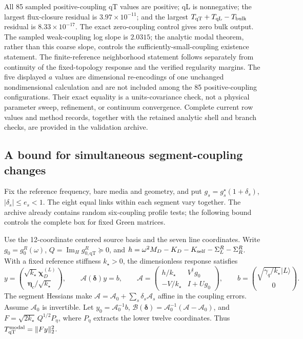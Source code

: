 \documentclass[10pt,aps,pre,onecolumn,notitlepage,nofootinbib]{revtex4-2}
\newcommand{\veta}{\bm\eta}
\newcommand{\vchi}{\bm\chi}
\newcommand{\qT}{\mathrm{qT}}
\newcommand{\qL}{\mathrm{qL}}
\newcommand{\ImH}{\operatorname{Im}_{\!H}}
\begin{document}
All 85 sampled positive-coupling qT values are positive; qL is nonnegative; the largest flux-closure residual is $3.97\times10^{-11}$; and the largest $T_{\qT}+T_{\qL}-T_{\rm bulk}$ residual is $8.33\times10^{-17}$. The exact zero-coupling control gives zero bulk output. The sampled weak-coupling log slope is $2.0315$; the analytic modal theorem, rather than this coarse slope, controls the sufficiently-small-coupling existence statement. The finite-reference neighborhood statement follows separately from continuity of the fixed-topology response and the verified regularity margins. The five displayed $a$ values are dimensional re-encodings of one unchanged nondimensional calculation and are not included among the 85 positive-coupling configurations. Their exact equality is a units-covariance check, not a physical parameter sweep, refinement, or continuum convergence. Complete current row values and method records, together with the retained analytic shell and branch checks, are provided in the validation archive.

\subsection{A bound for simultaneous segment-coupling changes}
\label{sec:sm-coupling-box}

Fix the reference frequency, bare media and geometry, and put $g_s=g_s^\star(1+\delta_s)$, $|\delta_s|\leq e_s<1$. The eight equal links within each segment vary together. The archive already contains random six-coupling profile tests; the following bound controls the complete box for fixed Green matrices.

Use the 12-coordinate centered source basis and the seven line coordinates. Write $g_0=g_0^R(\omega)$, $Q=\ImH g_{0,\qT}^R\succeq0$, and $h=\omega^2M_D-K_D-K_{\rm self}-\Sigma_L^R-\Sigma_R^R$. With a fixed reference stiffness $k_\star>0$, the dimensionless response satisfies
\begin{equation}
 y=\binom{\sqrt{k_\star}\vchi_D^{(L)}}{\veta_c/\sqrt{k_\star}},\qquad
 \mathcal A(\bm\delta)y=b,\qquad
 \mathcal A=
 \begin{pmatrix}h/k_\star&V^\dagger g_0\\-V/k_\star&I+Ug_0\end{pmatrix},\qquad
 b=\binom{\sqrt{\gamma_q/k_\star}|L\rangle}{0}.
 \label{eq:sm-box-system}
\end{equation}
The segment Hessians make $\mathcal A=\mathcal A_0+\sum_s\delta_s\mathcal A_s$ affine in the coupling errors. Assume $\mathcal A_0$ is invertible. Let $y_0=\mathcal A_0^{-1}b$, $\mathcal B(\bm\delta)=\mathcal A_0^{-1}(\mathcal A-\mathcal A_0)$, and $F=\sqrt{2k_\star}\,Q^{1/2}P_\eta$, where $P_\eta$ extracts the lower twelve coordinates. Thus $T_{\qT}^{\rm modal}=\|Fy\|_2^2$.
\end{document}
